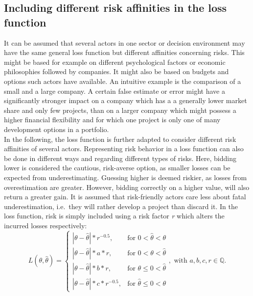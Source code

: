 		\subsection{Including different risk affinities in the loss function}		
		It can be assumed that several actors in one sector or decision environment may have the same general loss function but different affinities concerning risks. This might be based for example on different psychological factors or economic philosophies followed by companies. It might also be based on budgets and options such actors have available. An intuitive example is the comparison of a small and a large company. A certain false estimate or error might have a significantly stronger impact on a company which has a a generally lower market share and only few projects, than on a larger company which might possess a higher financial flexibility and for which one project is only one of many development options in a portfolio.\\		
		In the following, the loss function is further adapted to consider different risk affinities of several actors. Representing risk behavior in a loss function can also be done in different ways and regarding different types of risks. Here, bidding lower is considered the cautious, risk-averse option, as smaller losses can be expected from underestimating. Guessing higher is deemed riskier, as losses from overestimation are greater. However, bidding correctly on a higher value, will also return a greater gain. It is assumed that risk-friendly actors care less about fatal underestimation, i.e.\ they will rather develop a project than discard it. In the loss function, risk is simply included using a risk factor \textit{r} which alters the incurred losses respectively:
		\begin{equation}\label{eq:LFR_final}
		L(\theta,\hat{\theta}) =
		\begin{cases}
		|\theta - \hat{\theta}|*r^{-0.5}, & \text{for } 0<\hat{\theta}<\theta  \\
		|\theta-\hat{\theta}|*a*r, & \text{for } 0<\theta<\hat{\theta} \\
		|\theta-\hat{\theta}|*b*r, & \text{for } \theta\leq0<\hat{\theta} \\
		|\theta-\hat{\theta}|*c*r^{-0.5}, & \text{for } \hat{\theta}\leq0<\theta 
		\end{cases},
		\text{ with } a,b,c,r \in \mathbb{Q}.
		\end{equation}	
